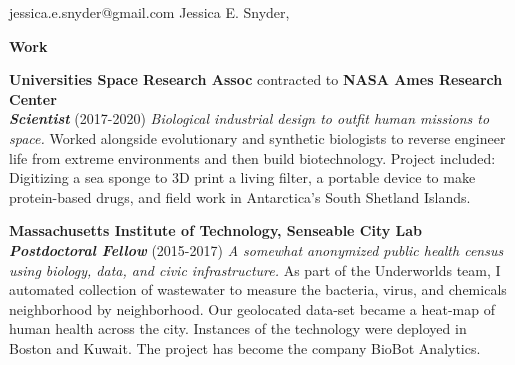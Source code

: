 \documentclass[11pt]{article}
\begin{document}
\begin{center}
jessica.e.snyder@gmail.com
\hspace{10mm}
\href{https://biology.work/}{\color{linkcolor}{https://biology.work/}} 
\hspace{10mm} 
\vskip 0.1in
{\LARGE Jessica E. Snyder, \color{demphasize}{PhD}}
\end{center}

\begin{flushleft}

\textbf{\Large Work} 

\textbf{Universities Space Research Assoc} contracted to \textbf{NASA Ames Research Center} \\ 
\textit{ \textbf{Scientist} }  (2017-2020)
\textit{Biological industrial design to outfit human missions to space.} 
Worked alongside evolutionary and synthetic biologists to reverse engineer life from extreme environments and then build biotechnology. Project included: Digitizing a sea sponge to 3D print a living filter, a portable device to make protein-based drugs, and field work in Antarctica's South Shetland Islands. 

\vskip 0.1in
\textbf{Massachusetts Institute of Technology, Senseable City Lab} \\
\textit{ \textbf{Postdoctoral Fellow}} (2015-2017) 
\textit{A \textit{somewhat} anonymized public health census using biology, data, and civic infrastructure.} 
As part of the Underworlds team, I automated collection of wastewater to measure the bacteria, virus, and chemicals neighborhood by neighborhood. Our geolocated data-set became a heat-map of human health across the city. Instances of the technology were deployed in Boston and Kuwait. The project has become the company BioBot Analytics. \\


\end{flushleft}
\end{document}
